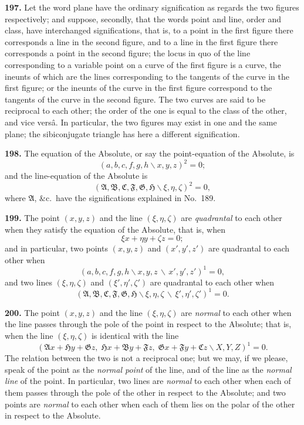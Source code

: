 \documentclass[11pt,a4paper]{article}
\begin{document}
\textbf{197.} Let the word plane have the ordinary signification as regards the two figures
respectively; and suppose, secondly, that the words point and line, order and class,
have interchanged significations, that is, to a point in the first figure there corresponds
a line in the second figure, and to a line in the first figure there corresponds a point
in the second figure; the locus in quo of the line corresponding to a variable point
on a curve of the first figure is a curve, the ineunts of which are the lines corresponding
to the tangents of the curve in the first figure; or the ineunts of the curve in the first
figure correspond to the tangents of the curve in the second figure. The two curves
are said to be reciprocal to each other; the order of the one is equal to the class of the
other, and vice vers\^{a}. In particular, the two figures may exist in one and the same
plane; the sibiconjugate triangle has here a different signification.

\textbf{198.} The equation of the Absolute, or say the point-equation of the Absolute, is
\[
(a,b,c,f,g,h\!\backslash x,y,z)^2 = 0;
\]
and the line-equation of the Absolute is
\[
(\mathfrak{A},\mathfrak{B},\mathfrak{C},\mathfrak{F},\mathfrak{G},\mathfrak{H}\!\backslash \xi,\eta,\zeta)^2 = 0,
\]
where $\mathfrak{A}$, \&c.\ have the significations explained in No.~189.

\textbf{199.} The point $(x,y,z)$ and the line $(\xi,\eta,\zeta)$ are \textit{quadrantal} to each other
when they satisfy the equation of the Absolute, that is, when
\[
\xi x + \eta y + \zeta z = 0;
\]
and in particular, two points $(x,y,z)$ and $(x',y',z')$ are quadrantal to each other when
\[
(a,b,c,f,g,h\!\backslash x,y,z\,\backslash\,x',y',z')^1 = 0,
\]
and two lines $(\xi,\eta,\zeta)$ and $(\xi',\eta',\zeta')$ are quadrantal to each other when
\[
(\mathfrak{A},\mathfrak{B},\mathfrak{C},\mathfrak{F},\mathfrak{G},\mathfrak{H}\!\backslash \xi,\eta,\zeta\,\backslash\,\xi',\eta',\zeta')^1 = 0.
\]

\textbf{200.} The point $(x,y,z)$ and the line $(\xi,\eta,\zeta)$ are \textit{normal} to each other when
the line passes through the pole of the point in respect to the Absolute; that is, when
the line $(\xi,\eta,\zeta)$ is identical with the line
\[
(\mathfrak{A}x+\mathfrak{H}y+\mathfrak{G}z,\; \mathfrak{H}x+\mathfrak{B}y+\mathfrak{F}z,\; \mathfrak{G}x+\mathfrak{F}y+\mathfrak{C}z\!\backslash X,Y,Z)^1 = 0.
\]
The relation between the two is not a reciprocal one; but we may, if we please,
speak of the point as the \textit{normal point} of the line, and of the line as the \textit{normal line} of
the point. In particular, two lines are \textit{normal} to each other when each of them passes
through the pole of the other in respect to the Absolute; and two points are \textit{normal}
to each other when each of them lies on the polar of the other in respect to the
Absolute.
\end{document}
